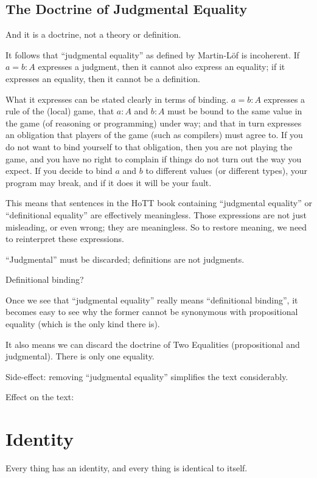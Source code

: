 \documentclass{article}
\begin{document}
\subsection{The Doctrine of Judgmental Equality}

And it is a doctrine, not a theory or definition.

It follows that ``judgmental equality'' as defined by Martin-Löf is
incoherent. If \(a=b:A\) expresses a judgment, then it cannot also
express an equality; if it expresses an equality, then it cannot be a
definition.

What it expresses can be stated clearly in terms of binding. \(a=b:A\)
expresses a rule of the (local) game, that \(a:A\) and \(b:A\) must be
bound to the same value in the game (of reasoning or programming)
under way; and that in turn expresses an obligation that players of
the game (such as compilers) must agree to. If you do not want to bind
yourself to that obligation, then you are not playing the game, and
you have no right to complain if things do not turn out the way you
expect. If you decide to bind \(a\) and \(b\) to different values (or
different types), your program may break, and if it does it will be
your fault.

This means that sentences in the HoTT book containing ``judgmental
equality'' or ``definitional equality'' are effectively meaningless.
Those expressions are not just misleading, or even wrong; they are
meaningless. So to restore meaning, we need to reinterpret these
expressions.

``Judgmental'' must be discarded; definitions are not judgments.

Definitional binding?

Once we see that ``judgmental equality'' really means ``definitional
binding'', it becomes easy to see why the former cannot be synonymous
with propositional equality (which is the only kind there is).

It also means we can discard the doctrine of Two Equalities
(propositional and judgmental). There is only one equality.

Side-effect: removing ``judgmental equality'' simplifies the text
considerably.

Effect on the text:


\section{Identity}
Every thing has an identity, and every thing is identical to itself.
\end{document}
